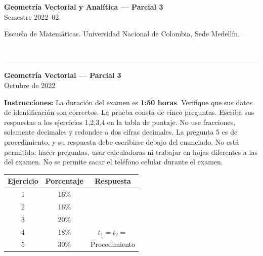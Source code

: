 \documentclass[11pt]{article}
\begin{document}
\noindent
\begin{minipage}[t]{0.6\linewidth}
{\small\bfseries Geometría Vectorial y Analítica --- Parcial 3}\\
{\small Semestre 2022--02}
\end{minipage}%
\hfill
\begin{minipage}[t]{0.35\linewidth}
\raggedleft\small Escuela de Matemáticas. Universidad Nacional de Colombia, Sede Medellín.
\end{minipage}\\[2pt]
\rule{\linewidth}{0.6pt}

\begin{center}
\textbf{Geometría Vectorial --- Parcial 3}\\
Octubre de 2022
\end{center}

\textbf{Instrucciones:} La duración del examen es \textbf{1:50 horas}. Verifique que sus datos de identificación son correctos. La prueba consta de cinco preguntas. Escriba sus respuestas a los ejercicios 1,2,3,4 en la tabla de puntaje. No use fracciones, solamente decimales y redondee a dos cifras decimales. La pregunta 5 es de procedimiento, y su respuesta debe escribirse debajo del enunciado. No está permitido: hacer preguntas, usar calculadoras ni trabajar en hojas diferentes a las del examen. No se permite sacar el teléfono celular durante el examen.

\begin{center}
\begin{tabular}{|c|c|c|}
\hline
Ejercicio & Porcentaje & Respuesta\\
\hline
1 & 16\% & \\
\hline
2 & 16\% & \\
\hline
3 & 20\% & \\
\hline
4 & 18\% & $t_1=$\hspace{1.5cm}$t_2=$\\
\hline
5 & 30\% & Procedimiento\\
\hline
\end{tabular}
\end{center}
\end{document}

